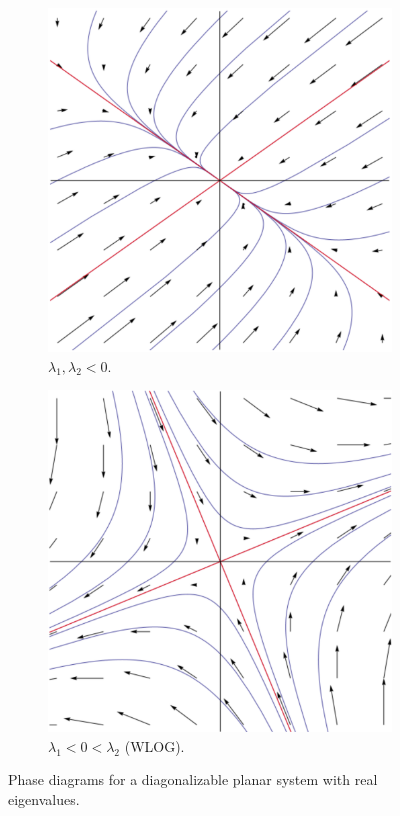 \documentclass[../notes.tex]{subfiles}
\begin{document}
\begin{itemize}
\begin{figure}[h!]
\begin{subfigure}[b]{0.32\linewidth}
            \includegraphics[width=0.8\linewidth]{../ExtFiles/planarRealDiagb.png}
            \caption{$\lambda_1,\lambda_2<0$.}
            \label{fig:planarRealDiagb}
        \end{subfigure}
        \begin{subfigure}[b]{0.32\linewidth}
            \centering
            \includegraphics[width=0.8\linewidth]{../ExtFiles/planarRealDiagc.png}
            \caption{$\lambda_1<0<\lambda_2$ (WLOG).}
            \label{fig:planarRealDiagc}
        \end{subfigure}
        \caption{Phase diagrams for a diagonalizable planar system with real eigenvalues.}

\end{figure}
\end{itemize}
\end{document}
